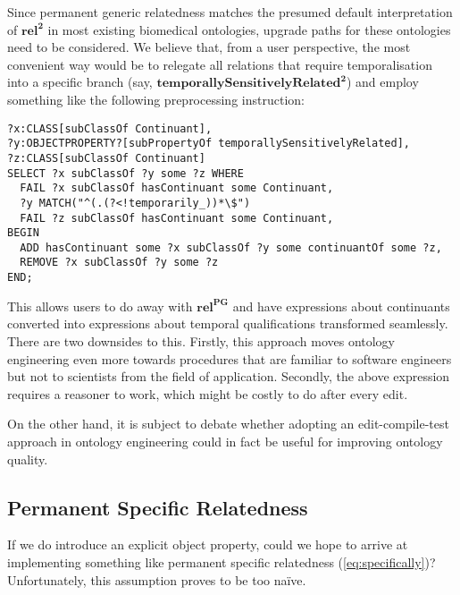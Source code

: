 \documentclass[10pt]{bmc_article}
\newcommand{\mirel}[1]{\ensuremath{\mathrm{\mathbf{#1}}}}
\newcommand{\mrel}[2]{\mirel{#1^#2}}
\newcommand{\mrelb}[1]{\mrel{#1}{2}}
\newcommand{\mrelpg}[1]{\mrel{#1}{{PG}}}
\newenvironment{bmcformat}{\baselineskip20pt\sloppy\setboolean{publ}{false}}{\baselineskip20pt\sloppy}
\begin{document}
\begin{bmcformat}
Since permanent generic relatedness matches the presumed default interpretation
of \mrelb{rel} in most existing biomedical ontologies, upgrade paths for these
ontologies need to be considered. We believe that, from a user perspective, the
most convenient way would be to relegate all relations that require
temporalisation into a specific branch (say,
\mrelb{temporallySensitivelyRelated}) and employ something like the following 
preprocessing instruction:
\begin{lstlisting}
?x:CLASS[subClassOf Continuant],
?y:OBJECTPROPERTY?[subPropertyOf temporallySensitivelyRelated],
?z:CLASS[subClassOf Continuant] 
SELECT ?x subClassOf ?y some ?z WHERE 
  FAIL ?x subClassOf hasContinuant some Continuant,
  ?y MATCH("^(.(?<!temporarily_))*\$")
  FAIL ?z subClassOf hasContinuant some Continuant,
BEGIN
  ADD hasContinuant some ?x subClassOf ?y some continuantOf some ?z,
  REMOVE ?x subClassOf ?y some ?z
END;
\end{lstlisting}
This allows users to do away with \mrelpg{rel} and have expressions about
continuants converted into expressions about temporal qualifications transformed
seamlessly. There are two downsides to this. Firstly, this approach moves
ontology engineering even more towards procedures that are familiar to
software engineers but not to scientists from the field of application.
Secondly, the above expression requires a reasoner to work, which might be
costly to do after every edit.

On the other hand, it is subject to debate whether adopting an edit-compile-test
approach in ontology engineering could in fact be useful for improving ontology quality.

\subsection*{Permanent Specific Relatedness}
If we do introduce an explicit object property, could we hope to arrive at
implementing something like permanent specific relatedness
(\ref{eq:specifically})? Unfortunately, this assumption proves to be too na\"ive.


\end{bmcformat}
\end{document}
